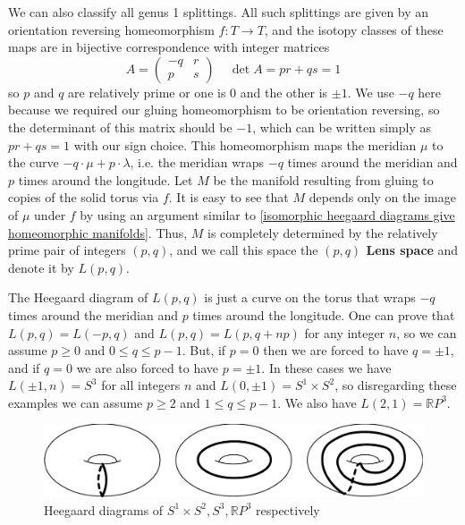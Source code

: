 \begin{example}
\label{Heegaard splitting description of lens spaces}
We can also classify all genus 1 splittings. All such splittings are given by an orientation reversing homeomorphism $f : T \rightarrow T$, and the isotopy classes of these maps are in bijective correspondence with integer matrices
\[ A = \begin{pmatrix} -q & r \\ p & s \end{pmatrix} \ \ \ \ \ \det A = pr + qs = 1 \]
so $p$ and $q$ are relatively prime or one is 0 and the other is $\pm 1$. We use $-q$ here because we required our gluing homeomorphism to be orientation reversing, so the determinant of this matrix should be $-1$, which can be written simply as $pr + qs = 1$ with our sign choice. This homeomorphism maps the meridian $\mu$ to the curve $-q \cdot \mu + p \cdot \lambda$, i.e. the meridian wraps $-q$ times around the meridian and $p$ times around the longitude. Let $M$ be the manifold resulting from gluing to copies of the solid torus via $f$. It is easy to see that $M$ depends only on the image of $\mu$ under $f$ by using an argument similar to \cref{isomorphic heegaard diagrams give homeomorphic manifolds}. Thus, $M$ is completely determined by the relatively prime pair of integers $(p,q)$, and we call this space the \textbf{$(p,q)$ Lens space} and denote it by $L(p,q)$.

The Heegaard diagram of $L(p,q)$ is just a curve on the torus that wraps $-q$ times around the meridian and $p$ times around the longitude. One can prove that $L(p,q) = L(-p,q)$ and $L(p,q) = L(p,q+np)$ for any integer $n$, so we can assume $p \geq 0$ and $0 \leq q \leq p-1$. But, if $p=0$ then we are forced to have $q=\pm 1$, and if $q=0$ we are also forced to have $p=\pm 1$. In these cases we have $L(\pm 1,n)=S^3$ for all integers $n$ and $L(0,\pm 1)=S^1\times S^2$, so disregarding these examples we can assume $p \geq 2$ and $1 \leq q \leq p-1$. We also have $L(2,1) = \mathbb RP^3$.

\begin{figure}[tb]
\centering
\includegraphics[scale=.6]{graphics/s1xs2-s3-rp3-hd}
\caption{Heegaard diagrams of $S^1 \times S^2, S^3, \mathbb RP^3$ respectively}
\label{s1xs2-s3-rp3-hd}
\end{figure}
\end{example}

